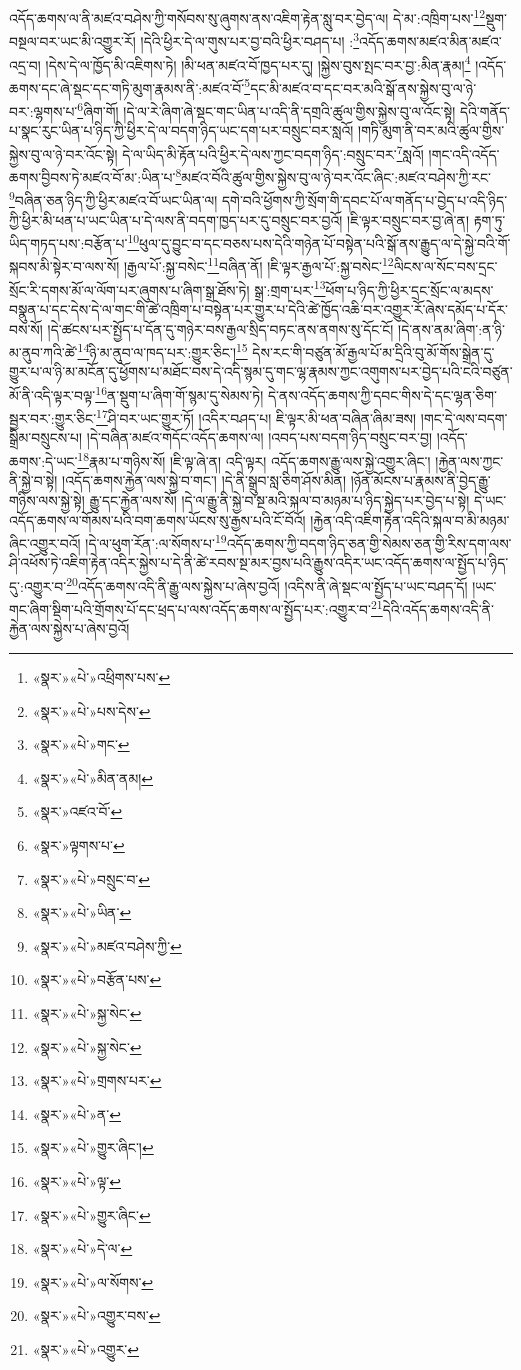 འདོད་ཆགས་ལ་ནི་མཛའ་བཤེས་ཀྱི་གསོབས་སུ་ཞུགས་ནས་འཇིག་རྟེན་སླུ་བར་བྱེད་ལ། དེ་མ་:འཁྲིག་པས་\footnote{«སྣར་»«པེ་»འཕྲིགས་པས་}\footnote{«སྣར་»«པེ་»པས་དེས་}སྡུག་བསྔལ་བར་ཡང་མི་འགྱུར་རོ། །དེའི་ཕྱིར་དེ་ལ་གུས་པར་བྱ་བའི་ཕྱིར་བཤད་པ། :\footnote{«སྣར་»«པེ་»གང་}འདོད་ཆགས་མཛའ་མིན་མཛའ་འདྲ་བ། །དེས་དེ་ལ་ཁྱོད་མི་འཇིགས་ཏེ། །མི་ཕན་མཛའ་བོ་ཁྱད་པར་དུ། །སྐྱེས་བུས་སྤང་བར་བྱ་:མིན་རྣམ།\footnote{«སྣར་»«པེ་»མིན་ནམ།} །འདོད་ཆགས་དང་ཞེ་སྡང་དང་གཏི་མུག་རྣམས་ནི་:མཛའ་བོ་\footnote{«སྣར་»འཛའ་བོ་}དང་མི་མཛའ་བ་དང་བར་མའི་སྒོ་ནས་སྐྱེས་བུ་ལ་ཉེ་བར་:ལྷགས་པ་\footnote{«སྣར་»ལྟགས་པ་}ཞིག་གོ། །དེ་ལ་རེ་ཞིག་ཞེ་སྡང་གང་ཡིན་པ་འདི་ནི་དགྲའི་ཚུལ་གྱིས་སྐྱེས་བུ་ལ་འོང་སྟེ། དེའི་གནོད་པ་སྣང་རུང་ཡིན་པ་ཉིད་ཀྱི་ཕྱིར་དེ་ལ་བདག་ཉིད་ཡང་དག་པར་བསྲུང་བར་སླའོ། །གཏི་མུག་ནི་བར་མའི་ཚུལ་གྱིས་སྐྱེས་བུ་ལ་ཉེ་བར་འོང་སྟེ། དེ་ལ་ཡིད་མི་རྟོན་པའི་ཕྱིར་དེ་ལས་ཀྱང་བདག་ཉིད་:བསྲུང་བར་\footnote{«སྣར་»«པེ་»བསྲུང་བ་}སླའོ། །གང་འདི་འདོད་ཆགས་བྱིབས་ཏེ་མཛའ་བོ་མ་:ཡིན་པ་\footnote{«སྣར་»«པེ་»ཡིན་}མཛའ་བོའི་ཚུལ་གྱིས་སྐྱེས་བུ་ལ་ཉེ་བར་འོང་ཞིང་:མཛའ་བཤེས་ཀྱི་རང་\footnote{«སྣར་»«པེ་»མཛའ་བཤེས་ཀྱི་}བཞིན་ཅན་ཉིད་ཀྱི་ཕྱིར་མཛའ་བོ་ཡང་ཡིན་ལ། དགེ་བའི་ཕྱོགས་ཀྱི་སྲོག་གི་དབང་པོ་ལ་གནོད་པ་བྱེད་པ་འདི་ཉིད་ཀྱི་ཕྱིར་མི་ཕན་པ་ཡང་ཡིན་པ་དེ་ལས་ནི་བདག་ཁྱད་པར་དུ་བསྲུང་བར་བྱའོ། །ཇི་ལྟར་བསྲུང་བར་བྱ་ཞེ་ན། རྟག་ཏུ་ཡིད་གཏད་པས་:བརྩོན་པ་\footnote{«སྣར་»«པེ་»བརྩོན་པས་}ཕུལ་དུ་བྱུང་བ་དང་བཅས་པས་དེའི་གཉེན་པོ་བསྟེན་པའི་སྒོ་ནས་རྒྱུད་ལ་དེ་སྐྱེ་བའི་གོ་སྐབས་མི་སྟེར་བ་ལས་སོ། །རྒྱལ་པོ་:སྐྱ་བསེང་\footnote{«སྣར་»«པེ་»སྐྱ་སེང་}བཞིན་ནོ། །ཇི་ལྟར་རྒྱལ་པོ་:སྐྱ་བསེང་\footnote{«སྣར་»«པེ་»སྐྱ་སེང་}ལིངས་ལ་སོང་བས་དྲང་སྲོང་རི་དགས་མོ་ལ་ལོག་པར་ཞུགས་པ་ཞིག་སྒྲ་ཐོས་ཏེ། སྒྲ་:གྲག་པར་\footnote{«སྣར་»«པེ་»གྲགས་པར་}ཕོག་པ་ཉིད་ཀྱི་ཕྱིར་དྲང་སྲོང་ལ་མདས་བསྣུན་པ་དང་དེས་དེ་ལ་གང་གི་ཚེ་འཁྲིག་པ་བསྟེན་པར་གྱུར་པ་དེའི་ཚེ་ཁྱོད་འཆི་བར་འགྱུར་རོ་ཞེས་དམོད་པ་དོར་བས་སོ། །དེ་ཚངས་པར་སྤྱོད་པ་དོན་དུ་གཉེར་བས་རྒྱལ་སྲིད་བཏང་ནས་ནགས་སུ་དོང་ངོ། །དེ་ནས་ནམ་ཞིག་:ན་ཉི་མ་ནུབ་ཀའི་ཚེ་\footnote{«སྣར་»«པེ་»ན་}ཉི་མ་ནུབ་ལ་ཁད་པར་:གྱུར་ཅིང་།\footnote{«སྣར་»«པེ་»གྱུར་ཞིང་།} དེས་རང་གི་བཙུན་མོ་རྒྱལ་པོ་མ་དྲིའི་བུ་མོ་གོས་སྒྲེན་དུ་གྱུར་པ་ལ་ཉི་མ་མངོན་དུ་ཕྱོགས་པ་མཐོང་བས་དེ་འདི་སྙམ་དུ་གང་ལྷ་རྣམས་ཀྱང་འགུགས་པར་བྱེད་པའི་ངའི་བཙུན་མོ་ནི་འདི་ལྟར་བལྟ་\footnote{«སྣར་»«པེ་»ལྟ་}ན་སྡུག་པ་ཞིག་གོ་སྙམ་དུ་སེམས་ཏེ། དེ་ནས་འདོད་ཆགས་ཀྱི་དབང་གིས་དེ་དང་ལྷན་ཅིག་སྦྱར་བར་:གྱུར་ཅིང་\footnote{«སྣར་»«པེ་»གྱུར་ཞིང་}ཤི་བར་ཡང་གྱུར་ཏོ། །འདིར་བཤད་པ། ཇི་ལྟར་མི་ཕན་བཞིན་ཞིམ་ཟས། །གང་དེ་ལས་བདག་སྒྲིམ་བསྲུངས་པ། །དེ་བཞིན་མཛའ་གདོང་འདོད་ཆགས་ལ། །འབད་པས་བདག་ཉིད་བསྲུང་བར་བྱ། །འདོད་ཆགས་:དེ་ཡང་\footnote{«སྣར་»«པེ་»དེ་ལ་}རྣམ་པ་གཉིས་སོ། །ཇི་ལྟ་ཞེ་ན། འདི་ལྟར། འདོད་ཆགས་རྒྱུ་ལས་སྐྱེ་འགྱུར་ཞིང་། །རྐྱེན་ལས་ཀྱང་ནི་སྐྱེ་བ་སྟེ། །འདོད་ཆགས་རྐྱེན་ལས་སྐྱེ་བ་གང་། །དེ་ནི་སྒྲུབ་སླ་ཅིག་ཤོས་མིན། །ཉོན་མོངས་པ་རྣམས་ནི་བྱེད་རྒྱུ་གཉིས་ལས་སྐྱེ་སྟེ། རྒྱུ་དང་རྐྱེན་ལས་སོ། །དེ་ལ་རྒྱུ་ནི་སྐྱེ་བ་སྔ་མའི་སྐལ་བ་མཉམ་པ་ཉིད་སྐྱེད་པར་བྱེད་པ་སྟེ། དེ་ཡང་འདོད་ཆགས་ལ་གོམས་པའི་བག་ཆགས་ཡོངས་སུ་རྒྱས་པའི་ངོ་བོའོ། །རྐྱེན་འདི་འཇིག་རྟེན་འདིའི་སྐལ་བ་མི་མཉམ་ཞིང་འགྱུར་བའོ། །དེ་ལ་ཕུག་རོན་:ལ་སོགས་པ་\footnote{«སྣར་»«པེ་»ལ་སོགས་}འདོད་ཆགས་ཀྱི་བདག་ཉིད་ཅན་གྱི་སེམས་ཅན་གྱི་རིས་དག་ལས་ཤི་འཕོས་ཏེ་འཇིག་རྟེན་འདིར་སྐྱེས་པ་དེ་ནི་ཚེ་རབས་སྔ་མར་བྱས་པའི་རྒྱུས་འདིར་ཡང་འདོད་ཆགས་ལ་སྤྱོད་པ་ཉིད་དུ་:འགྱུར་བ་\footnote{«སྣར་»«པེ་»འགྱུར་བས་}འདོད་ཆགས་འདི་ནི་རྒྱུ་ལས་སྐྱེས་པ་ཞེས་བྱའོ། །འདིས་ནི་ཞེ་སྡང་ལ་སྤྱོད་པ་ཡང་བཤད་དོ། །ཡང་གང་ཞིག་སྡིག་པའི་གྲོགས་པོ་དང་ཕྲད་པ་ལས་འདོད་ཆགས་ལ་སྤྱོད་པར་:འགྱུར་བ་\footnote{«སྣར་»«པེ་»འགྱུར་}དེའི་འདོད་ཆགས་འདི་ནི་རྐྱེན་ལས་སྐྱེས་པ་ཞེས་བྱའོ། 